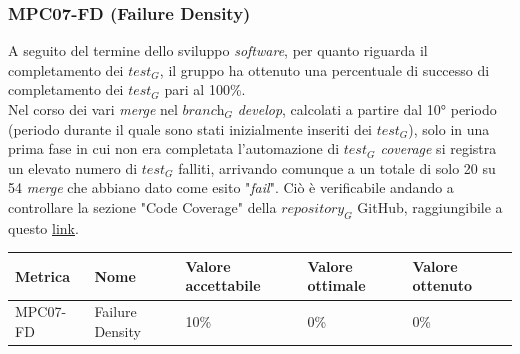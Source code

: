 \subsubsection{MPC07-FD (Failure Density)}
A seguito del termine dello sviluppo \textit{software}, per quanto riguarda il completamento dei $\textit{test}_G$, il gruppo ha ottenuto una percentuale di successo di completamento dei $\textit{test}_G$ pari al 100\%. \\
Nel corso dei vari \textit{merge} nel $\textit{branch}_G$ \textit{develop}, calcolati a partire dal 10° periodo (periodo durante il quale sono stati inizialmente inseriti dei \textit{$\textit{test}_G$}), solo in una prima fase in cui non era completata l'automazione di \textit{$\textit{test}_G$ coverage} si registra un elevato numero di $\textit{test}_G$ falliti, arrivando comunque a un totale di solo 20 su 54 \textit{merge} che abbiano dato come esito "\textit{fail}". Ciò è verificabile andando a controllare la sezione "Code Coverage" della $\textit{repository}_G$ GitHub, raggiungibile a questo \href{https://github.com/RAMtastic6/EasyMeal/actions/workflows/$\textit{test}_G$.yml?query=is%3Acompleted+$\textit{branch}_G$%3Adevelop}{link}.
\begin{center}
    \begin{tabular}{|p{3cm}|p{4cm}|p{3cm}|p{3cm}|p{3cm}|}
    \hline
    \textbf{Metrica} & \textbf{Nome} & \textbf{Valore \newline accettabile} & \textbf{Valore \newline ottimale} & \textbf{Valore \newline ottenuto} \\
    \hline
    MPC07-FD & Failure Density & 10\% & 0\% & 0\% \\
    \hline
    \end{tabular}
\end{center}